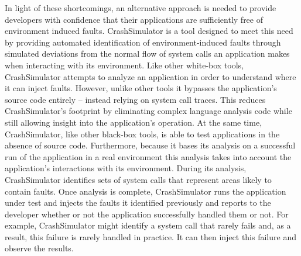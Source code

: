     In light of these shortcomings, an alternative approach is needed to provide developers with confidence that their
    applications are sufficiently free of environment induced faults.  CrashSimulator is a tool designed to meet this
    need by providing automated identification of environment-induced faults through simulated deviations from the
    normal flow of system calls an application makes when interacting with its environment. Like other white-box tools,
    CrashSimulator attempts to analyze an application in order to understand where it can inject faults.  However,
    unlike other tools it bypasses the application's source code entirely -- instead relying on system call traces. This
    reduces CrashSimulator's footprint by eliminating complex language analysis code while still allowing insight into
    the application's operation. At the same time, CrashSimulator, like other black-box tools, is able to test
    applications in the absence of source code. Furthermore, because it bases its analysis on a successful run of the
    application in a real environment this analysis takes into account the application's interactions with its
    environment. During its analysis, CrashSimulator identifies sets of system calls that represent areas likely to
    contain faults. Once analysis is complete, CrashSimulator runs the application under test and injects the faults it
    identified previously and reports to the developer whether or not the application successfully handled them or not.
    For example, CrashSimulator might identify a system call that rarely fails and, as a result, this failure is rarely
    handled in practice. It can then inject this failure and observe the results.
